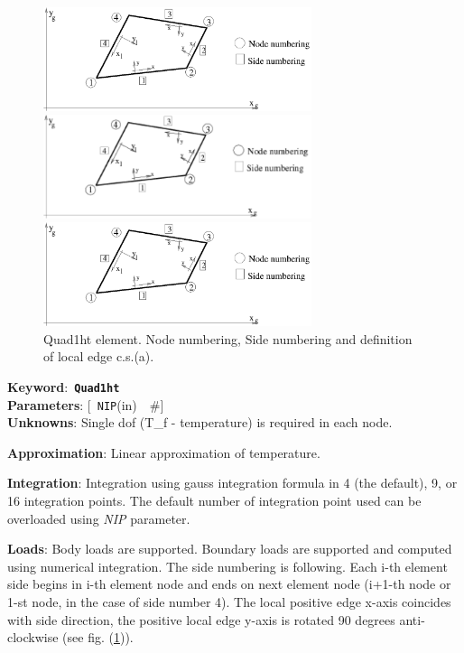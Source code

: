 \documentclass[a4paper]{article}
\newcommand{\descitem}[1]{{\noindent \bf #1}:}
\newcommand{\elemkeyword}[1]{\descitem{Keyword}~{\bf \texttt{#1}}}
\newcommand{\elemparam}[2]{{{\texttt{#1}\tiny (#2)}~~\#}}
\newcommand{\optelemparam}[2]{{[~\elemparam{#1}{#2}]}}
\newcommand{\param}[1]{{\em #1}}
\begin{document}
\begin{figure}[tb]
\begin{htmlonly}
  \centerline{\includegraphics[width=0.7\textwidth]{planestress2d.eps}}
\end{htmlonly}
\ifpdf
 \centerline{\includegraphics[width=0.7\textwidth]{planestress2d.pdf}}
\else
 \centerline{\includegraphics[width=0.7\textwidth]{planestress2d.eps}}
\fi
\caption{Quad1ht element. Node numbering, Side numbering and
definition of local edge c.s.(a).}
\label{Quad1htfig}
\end{figure}

\elemkeyword{Quad1ht}\\
\descitem{Parameters} \optelemparam{NIP}{in}\\
\descitem{Unknowns}
Single dof (T\_f - temperature) is required in each node.

\descitem{Approximation} Linear approximation of temperature.

\descitem{Integration}
Integration using gauss integration formula
in 4 (the default), 9, or 16 integration points. The default number of
integration point used can be overloaded using \param{NIP} parameter.

\descitem{Loads} Body loads are supported. Boundary loads are
supported and computed using numerical integration. The side numbering is
following. Each i-th element side begins in i-th element node and
ends on next element node (i+1-th node or 1-st node, in the case of 
side number 4). The local positive edge x-axis coincides with side
direction, the positive local edge y-axis is rotated 90 degrees
anti-clockwise (see fig. (\ref{Quad1htfig})).
\end{document}
